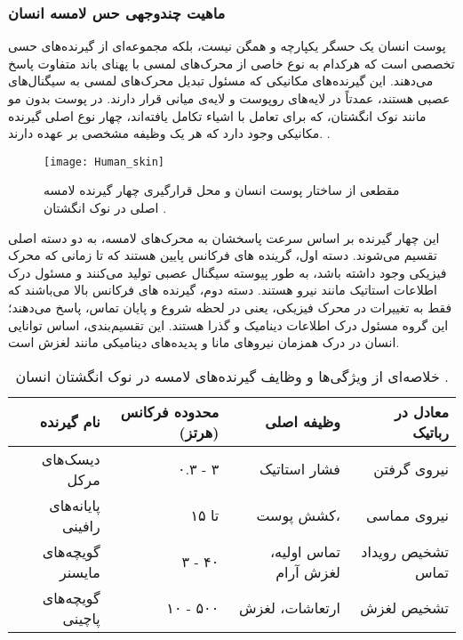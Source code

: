 \subsubsection{ ماهیت چندوجهی حس لامسه انسان}

پوست انسان یک حسگر یکپارچه و همگن نیست، بلکه مجموعه‌ای از گیرنده‌های حسی تخصصی است که هرکدام به نوع خاصی از محرک‌های لمسی با پهنای باند متفاوت پاسخ می‌دهند. این گیرنده‌های مکانیکی
 که مسئول تبدیل محرک‌های لمسی به سیگنال‌های عصبی هستند، عمدتاً در لایه‌های روپوست
و لایه‌ی میانی
قرار دارند. در پوست بدون مو  مانند نوک انگشتان، که برای تعامل با اشیاء تکامل یافته‌اند، چهار نوع اصلی گیرنده مکانیکی وجود دارد که هر یک وظیفه مشخصی بر عهده دارند.
 \cite{wettels2011biomimetic, chi2018recent}.
\\
\begin{figure}[t]
	\centering
	\centerline{\texttt{[image: Human\_skin]}}
	\caption{مقطعی از ساختار پوست انسان و محل قرارگیری چهار گیرنده لامسه اصلی در نوک انگشتان
		\cite{silvera2015artificial}
		. }
	\label{fig:skin_cross_section}
\end{figure}
این چهار گیرنده بر اساس سرعت پاسخشان به محرک‌های لامسه، به دو دسته اصلی تقسیم می‌شوند. دسته اول، گرینده های فرکانس پایین هستند که تا زمانی که محرک فیزیکی وجود داشته باشد، به طور پیوسته سیگنال عصبی تولید می‌کنند و مسئول درک اطلاعات استاتیک مانند نیرو هستند. دسته دوم، گیرنده های فرکانس بالا می‌باشند که فقط به تغییرات در محرک فیزیکی، یعنی در لحظه شروع و پایان تماس، پاسخ می‌دهند؛ این گروه مسئول درک اطلاعات دینامیک و گذرا هستند. این تقسیم‌بندی، اساس توانایی انسان در درک همزمان نیروهای مانا و پدیده‌های دینامیکی مانند لغزش است.
\begin{table}[ht]
	\caption{خلاصه‌ای از ویژگی‌ها و وظایف گیرنده‌های لامسه در نوک انگشتان انسان
\cite{chi2018recent}	
.}
	\label{tab:mechanoreceptors}
	\centering
	\onehalfspacing
	\begin{tabular}{|r|r|r|r|}
		\hline
		\textbf{نام گیرنده} & \textbf{محدوده فرکانس (هرتز)} &  \textbf{وظیفه اصلی} & \textbf{معادل در رباتیک} \\
		\hline \hline
		دیسک‌های مرکل
		\footnotemark
		
		 &  ۰.۳ - ۳ & فشار استاتیک&  نیروی گرفتن \\
		پایانه‌های رافینی
		\footnotemark
		 &  تا ۱۵ & کشش پوست، & نیروی مماسی\\
		گویچه‌های مایسنر
		\footnotemark
		 & ۳ - ۴۰ & تماس اولیه، لغزش آرام & تشخیص رویداد تماس \\
		گویچه‌های پاچینی 
		\footnotemark
		& ۱۰ - ۵۰۰ & ارتعاشات، لغزش  & تشخیص لغزش \\
		\hline
	\end{tabular}
\end{table}
